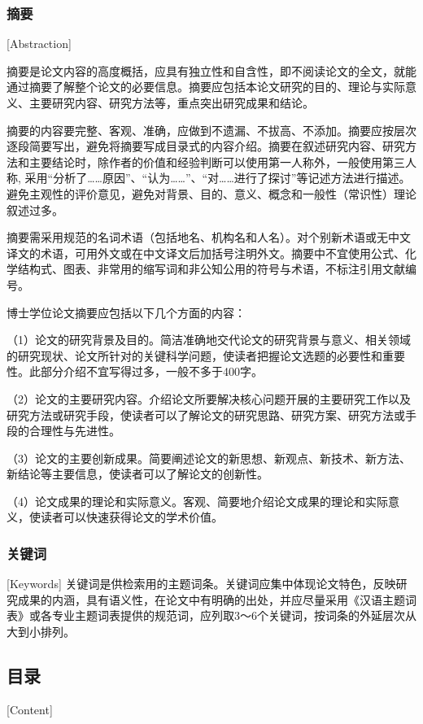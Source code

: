 \subsubsection{摘要}[Abstraction]

摘要是论文内容的高度概括，应具有独立性和自含性，即不阅读论文的全文，就能通过摘要了解整个论文的必要信息。摘要应包括本论文研究的目的、理论与实际意义、主要研究内容、研究方法等，重点突出研究成果和结论。

摘要的内容要完整、客观、准确，应做到不遗漏、不拔高、不添加。摘要应按层次逐段简要写出，避免将摘要写成目录式的内容介绍。摘要在叙述研究内容、研究方法和主要结论时，除作者的价值和经验判断可以使用第一人称外，一般使用第三人称, 采用“分析了……原因”、“认为……”、“对……进行了探讨”等记述方法进行描述。避免主观性的评价意见，避免对背景、目的、意义、概念和一般性（常识性）理论叙述过多。

摘要需采用规范的名词术语（包括地名、机构名和人名）。对个别新术语或无中文译文的术语，可用外文或在中文译文后加括号注明外文。摘要中不宜使用公式、化学结构式、图表、非常用的缩写词和非公知公用的符号与术语，不标注引用文献编号。

博士学位论文摘要应包括以下几个方面的内容：

（1）论文的研究背景及目的。简洁准确地交代论文的研究背景与意义、相关领域的研究现状、论文所针对的关键科学问题，使读者把握论文选题的必要性和重要性。此部分介绍不宜写得过多，一般不多于400字。

（2）论文的主要研究内容。介绍论文所要解决核心问题开展的主要研究工作以及研究方法或研究手段，使读者可以了解论文的研究思路、研究方案、研究方法或手段的合理性与先进性。

（3）论文的主要创新成果。简要阐述论文的新思想、新观点、新技术、新方法、新结论等主要信息，使读者可以了解论文的创新性。

（4）论文成果的理论和实际意义。客观、简要地介绍论文成果的理论和实际意义，使读者可以快速获得论文的学术价值。

\subsubsection{关键词}[Keywords]
关键词是供检索用的主题词条。关键词应集中体现论文特色，反映研究成果的内涵，具有语义性，在论文中有明确的出处，并应尽量采用《汉语主题词表》或各专业主题词表提供的规范词，应列取3～6个关键词，按词条的外延层次从大到小排列。

\subsection{目录}[Content]

